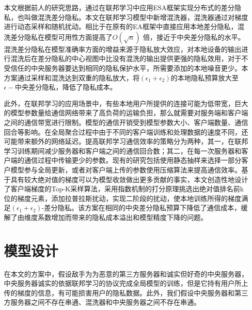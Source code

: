 本文根据前人的研究思路，通过在联邦学习中应用ESA框架实现分布式的差分隐私，也叫做混洗差分隐私。本文在联邦学习模型中新增混洗器，混洗器通过对梯度进行动态采样和随机扰动。相比于在原有的EA框架中直接应用本地差分隐私，混洗差分隐私在模型可用性方面提高了$O(\sqrt{n})$ 倍，接近于中央差分隐私的水平。混洗差分隐私在模型准确率方面的增益来源于隐私放大效应，对本地设备的输出进行混洗后在差分隐私的中心视图中比没有混洗的输出提供更强的隐私效用，对于不受信任的中央服务器要达到相同的隐私保护水平，所需要添加的本地噪音更少。本方案通过采样和混洗达到双重的隐私放大，将$\left(\epsilon_{1}+\epsilon_{2}\right)$的本地隐私预算放大至$\epsilon-$中央差分隐私，降低了隐私成本。

此外，在联邦学习的应用场景中，有些本地用户所提供的连接可能为低带宽，巨大的模型参数量给通信网络带来了高负荷的运输负担，那么就需要对服务端和客户端之间的通信带宽进行限制。模型的通信开销受到模型参数大小、客户端数量、通信回合等影响。在全局聚合过程中由于不同的客户端训练和处理数据的速度不同，还可能带来额外的网络延迟。提高联邦学习通信效率的策略分为两种，其一，在联邦学习训练期间减少服务器和客户端之间的通信回合数；其二，在每一次服务器和客户端的通信过程中传输更少的参数。现有的研究包括使用静态抽样来选择一部分客户模型参与全局更新，或者对客户端上传的参数使用压缩算法来提高通信效率。基于具有较大绝对值的梯度可以为模型收敛做出更多贡献的事实，本文创造性地设计了客户端梯度的Top-K采样算法，采用指数机制的打分原理挑选出绝对值排名前k位的梯度元素，添加拉普拉斯扰动，实现二阶段的扰动，使本地训练所得的梯度满足$\left(\epsilon_{1}+\epsilon_{2}\right)$-差分隐私。该方案在相同的中央差分隐私预算下降低了通信成本，缓解了由维度系数增加而带来的隐私成本溢出和模型精度下降的问题。


\section{模型设计}
在本文的方案中，假设敌手为为恶意的第三方服务器和诚实但好奇的中央服务器，中央服务器诚实的依据联邦学习的协议完成全局模型的训练，但是它持有用户所上传的梯度的信息，有可能损害用户的隐私数据。此外，我们假设中央服务器和第三方服务器之间不存在串通、混洗器和中央服务器之间不存在串通。

